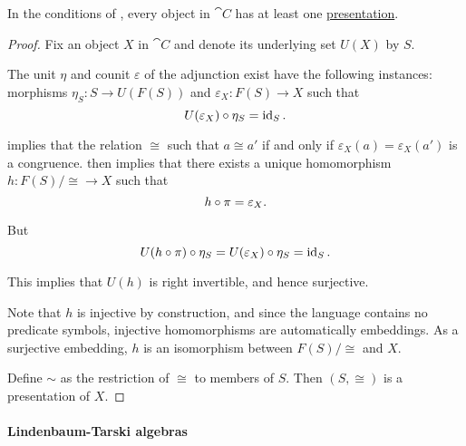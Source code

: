 \begin{proposition}\label{thm:object_presentation_existence}
  In the conditions of , every object in \( \cat{C} \) has at least one \hyperref[def:object_presentation]{presentation}.
\end{proposition}
\begin{proof}
  Fix an object \( X \) in \( \cat{C} \) and denote its underlying set \( U(X) \) by \( S \).

  The unit \( \eta \) and counit \( \varepsilon \) of the adjunction exist have the following instances: morphisms \( \eta_S: S \to U(F(S)) \) and \( \varepsilon_X: F(S) \to X \) such that
  \begin{equation*}
    U(\varepsilon_X) \bincirc \eta_S = \id_S.
  \end{equation*}

   implies that the relation \( {\cong} \) such that \( a \cong a' \) if and only if \( \varepsilon_X(a) = \varepsilon_X(a') \) is a congruence.  then implies that there exists a unique homomorphism \( h: F(S) / {\cong} \to X \) such that
  \begin{equation*}
    h \bincirc \pi = \varepsilon_X.
  \end{equation*}

  But
  \begin{equation*}
    U(h \bincirc \pi) \bincirc \eta_S = U(\varepsilon_X) \bincirc \eta_S = \id_S.
  \end{equation*}

  This implies that \( U(h) \) is right invertible, and hence surjective.

  Note that \( h \) is injective by construction, and since the language contains no predicate symbols, injective homomorphisms are automatically embeddings. As a surjective embedding, \( h \) is an isomorphism between \( F(S) / {\cong} \) and \( X \).

  Define \( {\sim} \) as the restriction of \( {\cong} \) to members of \( S \). Then \( (S, \cong) \) is a presentation of \( X \).
\end{proof}

\paragraph{Lindenbaum-Tarski algebras}
